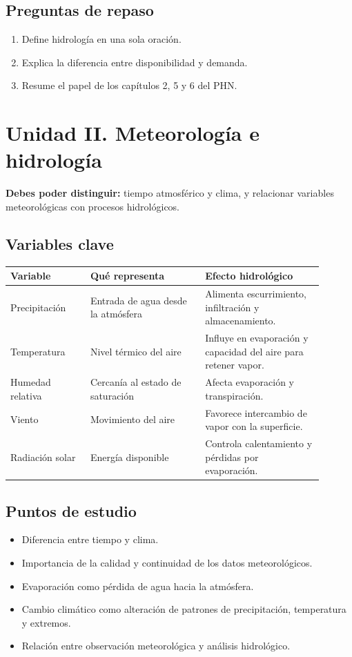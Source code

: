 \documentclass[11pt]{article}
\begin{document}
\subsection{Preguntas de repaso}
\begin{enumerate}
\item Define hidrología en una sola oración.
\item Explica la diferencia entre disponibilidad y demanda.
\item Resume el papel de los capítulos 2, 5 y 6 del PHN.
\end{enumerate}

\section{Unidad II. Meteorología e hidrología}
\begin{conceptbox}
\textbf{Debes poder distinguir:} tiempo atmosférico y clima, y relacionar variables meteorológicas con procesos hidrológicos.
\end{conceptbox}

\subsection{Variables clave}
\begin{center}
\begin{tabular}{p{0.23\linewidth} p{0.33\linewidth} p{0.34\linewidth}}
\toprule
\textbf{Variable} & \textbf{Qué representa} & \textbf{Efecto hidrológico} \\
\midrule
Precipitación & Entrada de agua desde la atmósfera & Alimenta escurrimiento, infiltración y almacenamiento. \\
Temperatura & Nivel térmico del aire & Influye en evaporación y capacidad del aire para retener vapor. \\
Humedad relativa & Cercanía al estado de saturación & Afecta evaporación y transpiración. \\
Viento & Movimiento del aire & Favorece intercambio de vapor con la superficie. \\
Radiación solar & Energía disponible & Controla calentamiento y pérdidas por evaporación. \\
\bottomrule
\end{tabular}
\end{center}

\subsection{Puntos de estudio}
\begin{itemize}
\item Diferencia entre tiempo y clima.
\item Importancia de la calidad y continuidad de los datos meteorológicos.
\item Evaporación como pérdida de agua hacia la atmósfera.
\item Cambio climático como alteración de patrones de precipitación, temperatura y extremos.
\item Relación entre observación meteorológica y análisis hidrológico.
\end{itemize}
\end{document}
